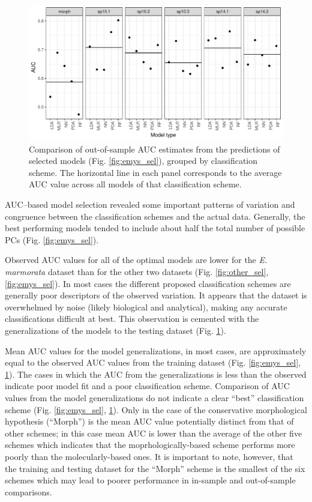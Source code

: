 \documentclass[fleqn,10pt,lineno]{wlpeerj} %
\begin{document}
\afterpage{\clearpage}
\begin{figure}[ht]
  \centering
  \includegraphics[height = \textheight, width = \textwidth, keepaspectratio = true]{figure/emys_oos_sel}
  \caption{Comparison of out-of-sample AUC estimates from the predictions of selected models (Fig. \ref{fig:emys_sel}), grouped by classification scheme. The horizontal line in each panel corresponds to the average AUC value across all models of that classification scheme.}
  \label{fig:emys_oos}
\end{figure}

AUC--based model selection revealed some important patterns of variation and congruence between the classification schemes and the actual data. Generally, the best performing models tended to include about half the total number of possible PCs (Fig. \ref{fig:emys_sel}). 

Observed AUC values for all of the optimal models are lower for the \textit{E. marmorata} dataset than for the other two datasets (Fig. \ref{fig:other_sel}, \ref{fig:emys_sel}). In most cases the different proposed classification schemes are generally poor descriptors of the observed variation. It appears that the dataset is overwhelmed by noise (likely biological and analytical), making any accurate classifications difficult at best. This observation is cemented with the generalizations of the models to the testing dataset (Fig. \ref{fig:emys_oos}).

Mean AUC values for the model generalizations, in most cases, are approximately equal to the observed AUC values from the training dataset (Fig. \ref{fig:emys_sel}, \ref{fig:emys_oos}). The  cases in which the AUC from the  generalizations is less than the observed indicate poor model fit and a poor classification scheme. Comparison of AUC values from the model generalizations do not indicate a clear ``best'' classification scheme (Fig. \ref{fig:emys_sel}, \ref{fig:emys_oos}). Only in the case of the conservative morphological hypothesis (``Morph'') is the mean AUC value potentially distinct from that of other schemes; in this case mean AUC is lower than the average of the other five schemes which indicates that the moprhologically-based scheme performs more poorly than the molecularly-based ones. It is important to note, however, that the training and testing dataset for the ``Morph'' scheme is the smallest of the six schemes which may lead to poorer performance in in-sample and out-of-sample comparisons.
\end{document}

